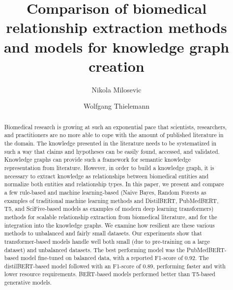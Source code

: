\documentclass[final,12pt,3p,times,twocolumn,authoryear]{elsarticle}
\begin{document}
\begin{frontmatter}





\title{Comparison of biomedical relationship extraction methods and models for knowledge graph creation}

 \author[nikola,nikola2]{Nikola Milosevic}
   


\author[wolfgang]{Wolfgang Thielemann}


\begin{abstract}
Biomedical research is growing at such an exponential pace that scientists, researchers, and practitioners are no more able to cope with the amount of published literature in the domain. The knowledge presented in the literature needs to be systematized in such a way that claims and hypotheses can be easily found, accessed, and validated. Knowledge graphs can provide such a framework for semantic knowledge representation from literature. However, in order to build a knowledge graph, it is necessary to extract knowledge as relationships between biomedical entities and normalize both entities and relationship types. In this paper, we present and compare a few rule-based and machine learning-based (Naive Bayes, Random Forests as examples of traditional machine learning methods and DistilBERT, PubMedBERT, T5, and SciFive-based models as examples of modern deep learning transformers) methods for scalable relationship extraction from biomedical literature, and for the integration into the knowledge graphs. We examine how resilient are these various methods to unbalanced and fairly small datasets. Our experiments show that transformer-based models handle well both small (due to pre-training on a large dataset) and unbalanced datasets. The best performing model was the PubMedBERT-based model fine-tuned on balanced data, with a reported F1-score of 0.92. The distilBERT-based model followed with an F1-score of 0.89, performing faster and with lower resource requirements. BERT-based models performed better than T5-based generative models.





\end{abstract}
\end{frontmatter}
\end{document}
